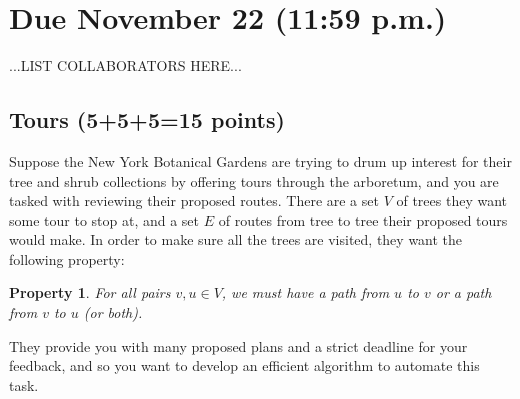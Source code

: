 \def\lc{\left\lceil}   
\def\rc{\right\rceil}
\newtheorem{claim}{Claim}
\newtheorem{property}{Property}
\runningheadrule
\firstpageheadrule
\cfoot{}

\section*{Due November 22 (11:59 p.m.)}
\intro

\vspace*{-1em}
...LIST COLLABORATORS HERE...






\subsection{Tours (5+5+5=15 points)}
Suppose the New York Botanical Gardens are trying to drum up interest for their tree and shrub collections by offering tours through the arboretum, and you are tasked with reviewing their proposed routes. There are a set $V$ of trees they want some tour to stop at, and a set $E$ of routes from tree to tree their proposed tours would make. In order to make sure all the trees are visited, they want the following property:
\begin{property} 
For all pairs $v, u\in V$, we must have a path from $u$ to $v$ or a path from $v$ to $u$ (or both). 
\end{property}
\noindent They provide you with many proposed plans and a strict deadline for your feedback, and so you want to develop an efficient algorithm to automate this task. 

